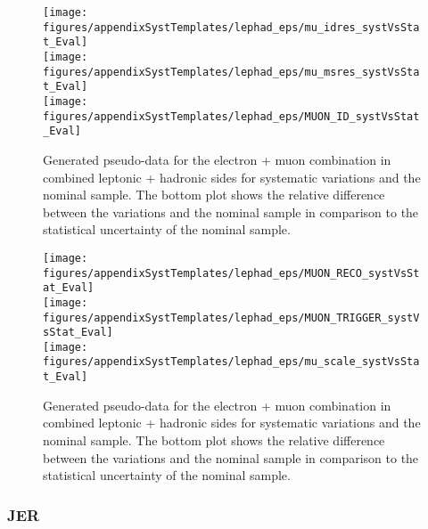 \begin{figure}[!hb]
\begin{center}
        
        \texttt{[image: figures/appendixSystTemplates/lephad\_eps/mu\_idres\_systVsStat\_Eval]}\\
        \texttt{[image: figures/appendixSystTemplates/lephad\_eps/mu\_msres\_systVsStat\_Eval]}\\
        \texttt{[image: figures/appendixSystTemplates/lephad\_eps/MUON\_ID\_systVsStat\_Eval]}
        
\caption{Generated pseudo-data for the electron + muon combination in combined leptonic + hadronic sides for systematic variations and the nominal \ttbar sample. The bottom plot shows the relative difference between the variations and the nominal sample in comparison to the statistical uncertainty of the nominal sample.}   
\label{fig:systematicVar_lephad_MUON}
\end{center}
\end{figure}


\begin{figure}[!hb]
\begin{center}
        
        \texttt{[image: figures/appendixSystTemplates/lephad\_eps/MUON\_RECO\_systVsStat\_Eval]}\\
        \texttt{[image: figures/appendixSystTemplates/lephad\_eps/MUON\_TRIGGER\_systVsStat\_Eval]}\\
        \texttt{[image: figures/appendixSystTemplates/lephad\_eps/mu\_scale\_systVsStat\_Eval]}
        
\caption{Generated pseudo-data for the electron + muon combination in combined leptonic + hadronic sides for systematic variations and the nominal \ttbar sample. The bottom plot shows the relative difference between the variations and the nominal sample in comparison to the statistical uncertainty of the nominal sample.}   
\label{fig:systematicVar_lephad_MUON}
\end{center}
\end{figure}



\clearpage
\subsubsection{JER}

